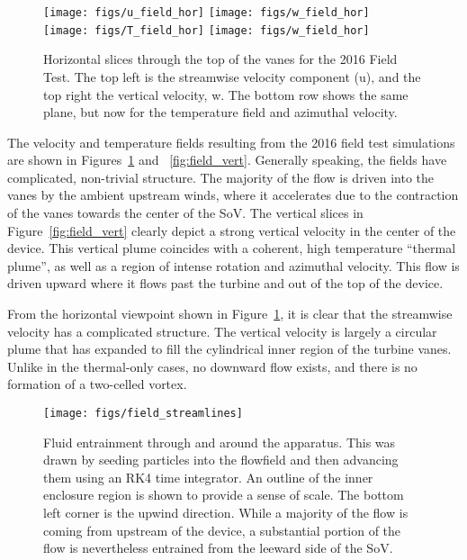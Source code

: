 \begin{figure}[!htb]
  \centering
  \texttt{[image: figs/u\_field\_hor]}
  \hfill
  \texttt{[image: figs/w\_field\_hor]}
  \\
  \texttt{[image: figs/T\_field\_hor]}
  \hfill
  \texttt{[image: figs/w\_field\_hor]}
 \caption{Horizontal slices through the top of the vanes for the
 2016 Field Test. The top left is the streamwise velocity component
 (u), and the top right the vertical velocity, w. The bottom row shows
 the same plane, but now for the temperature field and azimuthal velocity.} 
 \label{fig:field_hor}
\end{figure}

The velocity and temperature fields resulting from the 2016 field test   
simulations are shown in Figures~\ref{fig:field_hor} and
~\ref{fig:field_vert}. Generally speaking, the fields have
complicated, non-trivial structure. The majority of the flow is driven
into the vanes by the ambient upstream winds, where it accelerates due
to the contraction of the vanes towards the center of the SoV.
The vertical slices in Figure~\ref{fig:field_vert} clearly depict a
strong vertical velocity in the center of the device. This vertical
plume coincides with a coherent, high temperature ``thermal plume'', as
well as a region of intense rotation and azimuthal velocity. This flow
is driven upward where it flows past the turbine and out of the top of
the device. 

From the horizontal viewpoint shown in Figure~\ref{fig:field_hor}, it is
clear that the streamwise velocity has a complicated structure. The
vertical velocity is largely a circular plume that has expanded to fill
the cylindrical inner region of the turbine vanes. Unlike in the
thermal-only cases, no downward flow exists, and there is no formation
of a two-celled vortex. 

\begin{figure}[!htb]
  \centering
  \texttt{[image: figs/field\_streamlines]}
 \caption{Fluid entrainment through and around the apparatus. This was
 drawn by seeding particles into the flowfield and then advancing them  
 using an RK4 time integrator. An outline of the inner enclosure region 
 is shown to provide a sense of scale. The bottom left corner is the
 upwind direction. While a majority of the flow is coming from upstream
 of the device, a substantial portion of the flow is nevertheless
 entrained from the leeward side of the SoV. }  
 \label{fig:field_stream}
\end{figure}

